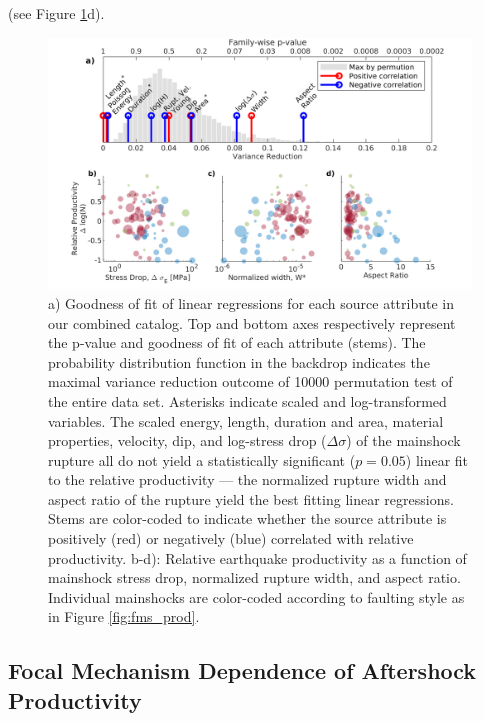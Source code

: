 \documentclass[draft, jgrga]{agujournal2018}
\begin{document}
     (see Figure \ref{fig:r2_finite_fault}d).
    
    \begin{figure}
        \centering
        \includegraphics[width = \linewidth]{figures/stem_plot.png}
        \caption{a) Goodness of fit of linear regressions for each source attribute in our combined catalog. Top and bottom axes respectively represent the p-value and goodness of fit of each attribute (stems). The probability distribution function in the backdrop indicates the maximal variance reduction outcome of 10000 permutation test of the entire data set. Asterisks indicate scaled and log-transformed variables. The scaled energy, length, duration and area, material properties, velocity, dip, and log-stress drop ($\Delta\sigma$) of the mainshock rupture all do not yield a statistically significant ($p=0.05$) linear fit to the relative productivity — the normalized rupture width and aspect ratio of the rupture yield the best fitting linear regressions. Stems are color-coded to indicate whether the source attribute is positively (red) or negatively (blue) correlated with relative productivity. b-d): Relative earthquake productivity as a function of mainshock stress drop, normalized rupture width, and aspect ratio. Individual mainshocks are color-coded according to faulting style as in Figure \ref{fig:fms_prod}.}
        \label{fig:r2_finite_fault}
    \end{figure}
    
    \subsection{Focal Mechanism Dependence of Aftershock Productivity} 
    
\end{document}
